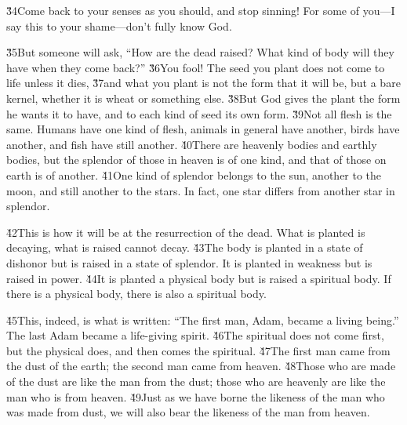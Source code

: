 \v{34}Come back to your senses as you should, and stop sinning! For some of you---I say this to your shame---don't fully know God.

\v{35}But someone will ask, ``How are the dead raised? What kind of body will they have when they come back?'' \v{36}You fool! The seed you plant does not come to life unless it dies, \v{37}and what you plant is not the form that it will be, but a bare kernel, whether it is wheat or something else. \v{38}But God gives the plant the form he wants it to have, and to each kind of seed its own form. \v{39}Not all flesh is the same. Humans have one kind of flesh, animals in general have another, birds have another, and fish have still another. \v{40}There are heavenly bodies and earthly bodies, but the splendor of those in heaven is of one kind, and that of those on earth is of another. \v{41}One kind of splendor belongs to the sun, another to the moon, and still another to the stars. In fact, one star differs from another star in splendor.

\v{42}This is how it will be at the resurrection of the dead. What is planted is decaying, what is raised cannot decay. \v{43}The body is planted in a state of dishonor but is raised in a state of splendor. It is planted in weakness but is raised in power. \v{44}It is planted a physical body but is raised a spiritual body. If there is a physical body, there is also a spiritual body.

\v{45}This, indeed, is what is written: ``The first man, Adam, became a living being.'' The last Adam became a life-giving spirit. \v{46}The spiritual does not come first, but the physical does, and then comes the spiritual. \v{47}The first man came from the dust of the earth; the second man came from heaven. \v{48}Those who are made of the dust are like the man from the dust; those who are heavenly are like the man who is from heaven. \v{49}Just as we have borne the likeness of the man who was made from dust, we will also bear the likeness of the man from heaven.

